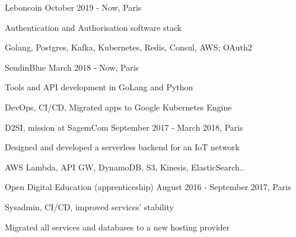 


\begin{cventries}

\cventry
{} %
{Leboncoin} %
{October 2019 - Now, Paris} %
{} %
{ %
\begin{cvitems}
\item {Authentication and Authorisation software stack}
\item {Golang, Postgres, Kafka, Kubernetes, Redis, Consul, AWS; OAuth2}
\end{cvitems}
}


\cventry
{} %
{SendinBlue} %
{March 2018 - Now, Paris} %
{} %
{ %
\begin{cvitems}
\item {Tools and API development in GoLang and Python}
\item {DevOps, CI/CD, Migrated apps to Google Kubernetes Engine}
\end{cvitems}
}

\cventry
{} %
{D2SI, mission at SagemCom} %
{September 2017 - March 2018, Paris} %
{} %
{ %
\begin{cvitems}
\item {Designed and developed a serverless backend for an IoT network}
\item {AWS Lambda, API GW, DynamoDB, S3, Kinesis, ElasticSearch..}
\end{cvitems}
}

\cventry
{} %
{Open Digital Education (apprenticeship)} %
{August 2016 - September 2017, Paris} %
{} %
{ %
\begin{cvitems}
\item {Sysadmin, CI/CD, improved services' stability}
\item {Migrated all services and databases to a new hosting provider}
\end{cvitems}
}


\end{cventries}
